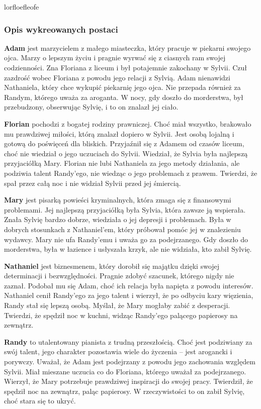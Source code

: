 lorfloefleofe

\subsubsection*{Opis wykreowanych postaci}

\textbf{Adam} jest marzycielem z małego miasteczka, który pracuje w piekarni swojego ojca. Marzy o lepszym
życiu i pragnie wyrwać się z ciasnych ram swojej codzienności. Zna Floriana z liceum i był
potajemnie zakochany w Sylvii. Czuł zazdrość wobec Floriana z powodu jego relacji z Sylvią.
Adam nienawidzi Nathaniela, który chce wykupić piekarnię jego ojca. Nie przepada również za
Randym, którego uważa za aroganta. W nocy, gdy doszło do morderstwa, był przebudzony, obserwując
Sylvię, i to on znalazł jej ciało.

\textbf{Florian} pochodzi z bogatej rodziny prawniczej. Choć miał wszystko, brakowało mu prawdziwej miłości,
którą znalazł dopiero w Sylvii. Jest osobą lojalną i gotową do poświęceń dla bliskich. Przyjaźnił
się z Adamem od czasów liceum, choć nie wiedział o jego uczuciach do Sylvii. Wiedział, że Sylvia
była najlepszą przyjaciółką Mary. Florian nie lubi Nathaniela za jego metody działania, ale
podziwia talent Randy'ego, nie wiedząc o jego problemach z prawem. Twierdzi, że spał przez całą
noc i nie widział Sylvii przed jej śmiercią.

\textbf{Mary} jest pisarką powieści kryminalnych, która zmaga się z finansowymi problemami. Jej najlepszą
przyjaciółką była Sylvia, która zawsze ją wspierała. Znała Sylvię bardzo dobrze, wiedziała o jej
depresji i problemach. Była w dobrych stosunkach z Nathaniel'em, który próbował pomóc jej w
znalezieniu wydawcy. Mary nie ufa Randy'emu i uważa go za podejrzanego. Gdy doszło do morderstwa,
była w łazience i usłyszała krzyk, ale nie widziała, kto zabił Sylvię.

\textbf{Nathaniel} jest biznesmenem, który dorobił się majątku dzięki swojej determinacji i bezwzględności.
Pragnie zdobyć szacunek, którego nigdy nie zaznał. Podobał mu się Adam, choć ich relacja była
napięta z powodu interesów. Nathaniel cenił Randy'ego za jego talent i wierzył, że po odbyciu kary
więzienia, Randy stał się lepszą osobą. Myślał, że Mary mogłaby zabić z desperacji. Twierdzi, że
spędził noc w kuchni, widząc Randy'ego palącego papierosy na zewnątrz.

\textbf{Randy} to utalentowany pianista z trudną przeszłością. Choć jest podziwiany za swój talent, jego
charakter pozostawia wiele do życzenia – jest arogancki i porywczy. Uważał, że Adam jest podejrzany
z powodu jego zachowania względem Sylvii. Miał mieszane uczucia co do Floriana, którego uważał za
podejrzanego. Wierzył, że Mary potrzebuje prawdziwej inspiracji do swojej pracy. Twierdził, że
spędził noc na zewnątrz, paląc papierosy. W rzeczywistości to on zabił Sylvię, choć stara się to
ukryć.

